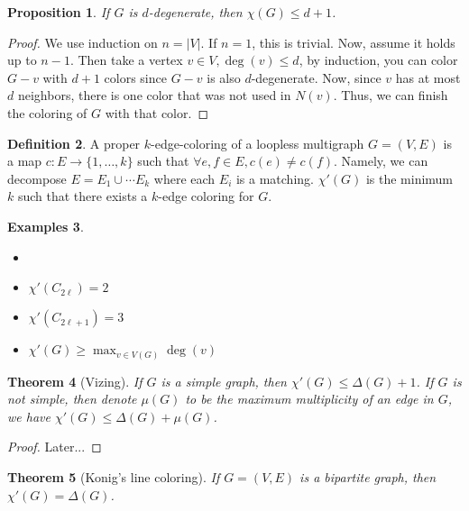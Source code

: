 \documentclass{tufte-handout}
\newtheorem{thm}{Theorem}
\newtheorem{prop}[thm]{Proposition}
\theoremstyle{definition}
\newtheorem{defn}[thm]{Definition}
\newtheorem{exmps}[thm]{Examples}
\theoremstyle{remark}
\begin{document}
\begin{prop}
	If $G$ is $d$-degenerate, then $\chi(G) \leq d+1$.
\end{prop}
\begin{proof}
	We use induction on $n = |V|$. If $n = 1$, this is trivial. Now, assume it holds up to $n-1$. Then take a vertex $v \in V, \deg(v) \leq d$, by induction, you can color $G-v$ with $d+1$ colors since $G-v$ is also $d$-degenerate. Now, since $v$ has at most $d$ neighbors, there is one color that was not used in $N(v)$. Thus, we can finish the coloring of $G$ with that color.
\end{proof}
\begin{defn}
	A proper $k$-edge-coloring of a loopless multigraph $G = (V,E)$ is a map $c: E \rightarrow \{1, \dots, k\}$ such that $\forall e,f \in E, c(e) \neq c(f)$. Namely, we can decompose $E = E_1 \cup \cdots E_k$ where each $E_i$ is a matching. $\chi'(G)$ is the minimum $k$ such that there exists a $k$-edge coloring for $G$.
\end{defn}
\begin{exmps}
	\begin{itemize}\item[]
		\item $\chi'(C_{2\ell}) = 2$
		\item $\chi'(C_{2\ell+1}) = 3$
		\item $\chi'(G) \geq \max_{v \in V(G)} \deg(v)$
	\end{itemize}
\end{exmps}
\begin{thm}[Vizing]
If $G$ is a simple graph, then $\chi'(G) \leq \Delta(G)+1$. If $G$ is not simple, then denote $\mu(G)$ to be the maximum multiplicity of an edge in $G$, we have $\chi'(G) \leq \Delta(G)+\mu(G)$.
\end{thm}
\begin{proof}
	Later...
\end{proof}
\begin{thm}[Konig's line coloring]
	If $G = (V,E)$ is a bipartite graph, then $\chi'(G) = \Delta(G)$.
\end{thm}
\end{document}
